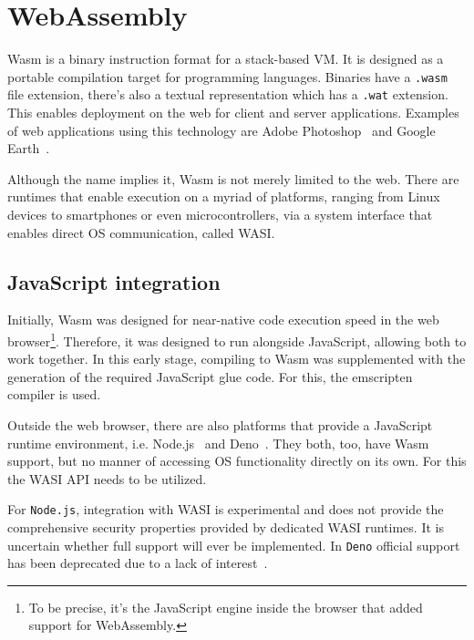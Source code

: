 \section{WebAssembly}
\label{chap:wasm}

\gls{Wasm} is a binary instruction format for a stack-based \gls{VM}. It is designed as a portable compilation target for programming languages. Binaries have a \texttt{.wasm} file extension, there's also a textual representation which has a \texttt{.wat} extension. This enables deployment on the web for client and server applications. Examples of web applications using this technology are Adobe Photoshop~\cite{wasm:ps} and Google Earth~\cite{wasm:ge}.

Although the name implies it, \gls{Wasm} is not merely limited to the web. There are runtimes that enable execution on a myriad of platforms, ranging from Linux devices to smartphones or even microcontrollers, via a system interface that enables direct \gls{OS} communication, called \gls{WASI}.

\subsection{JavaScript integration}

Initially, \gls{Wasm} was designed for near-native code execution speed in the web browser\footnote{To be precise, it's the JavaScript engine inside the browser that added support for WebAssembly.}. Therefore, it was designed to run alongside JavaScript, allowing both to work together. In this early stage, compiling to \gls{Wasm} was supplemented with the generation of the required JavaScript glue code. For this, the emscripten~\cite{gh:emscripten} compiler is used.

Outside the web browser, there are also platforms that provide a JavaScript runtime environment, i.e. Node.js~\cite{nodejs} and Deno~\cite{deno}. They both, too, have \gls{Wasm} support, but no manner of accessing \gls{OS} functionality directly on its own. For this the \gls{WASI} \gls{API} needs to be utilized.

For \texttt{Node.js}, integration with \gls{WASI} is experimental and does not provide the comprehensive security properties provided by dedicated \gls{WASI} runtimes. It is uncertain whether full support will ever be implemented. In \texttt{Deno} official support has been deprecated due to a lack of interest~\cite{deno:wasi}.
